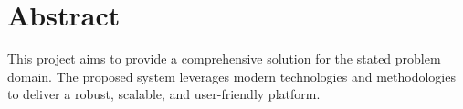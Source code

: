 \chapter*{Abstract}

\lipsum[1-2]

This project aims to provide a comprehensive solution for the stated problem domain.
The proposed system leverages modern technologies and methodologies to deliver
a robust, scalable, and user-friendly platform.

\lipsum[3]
